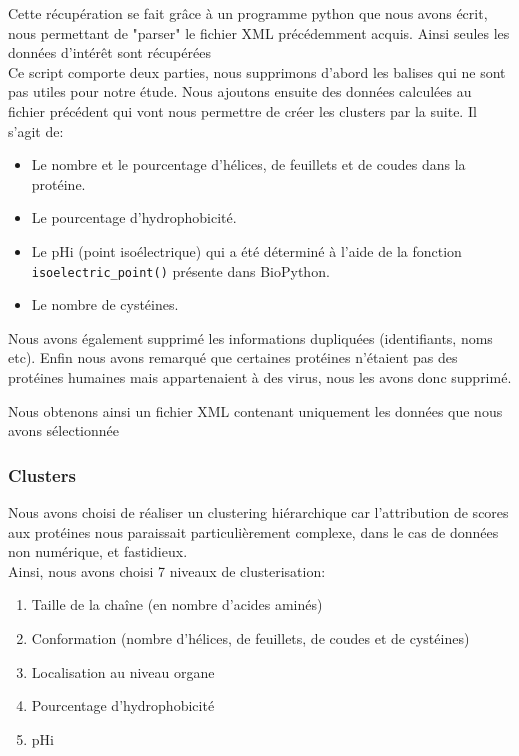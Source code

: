 Cette récupération se fait grâce à un programme python que nous avons écrit, nous permettant de "parser" le fichier XML précédemment acquis. Ainsi seules les données d'intérêt sont récupérées\\

Ce script comporte deux parties, nous supprimons d'abord les balises qui ne sont pas utiles pour notre étude.
Nous ajoutons ensuite des données calculées au fichier précédent qui vont nous permettre de créer les clusters par la suite. Il s'agit de:
\begin{itemize}
\item Le nombre et le pourcentage d'hélices, de feuillets et de coudes dans la protéine.
\item Le pourcentage d'hydrophobicité.
\item Le pHi (point isoélectrique) qui a été déterminé à l'aide de la fonction\\ \texttt{isoelectric\_point()} présente dans BioPython.
\item Le nombre de cystéines.
\end{itemize}

Nous avons également supprimé les informations dupliquées (identifiants, noms etc).
Enfin nous avons remarqué que certaines protéines n'étaient pas des protéines humaines mais appartenaient à des virus, nous les avons donc supprimé.

Nous obtenons ainsi un fichier XML contenant uniquement les données que nous avons sélectionnée


\subsubsection*{Clusters}
Nous avons choisi de réaliser un clustering hiérarchique car l'attribution de scores aux protéines nous paraissait particulièrement complexe, dans le cas de données non numérique, et fastidieux.\\
Ainsi, nous avons choisi 7 niveaux de clusterisation:
\begin{enumerate}
\item Taille de la chaîne (en nombre d'acides aminés)
\item Conformation (nombre d'hélices, de feuillets, de coudes et de cystéines)
\item Localisation au niveau organe
\item Pourcentage d'hydrophobicité
\item pHi
\end{enumerate}


